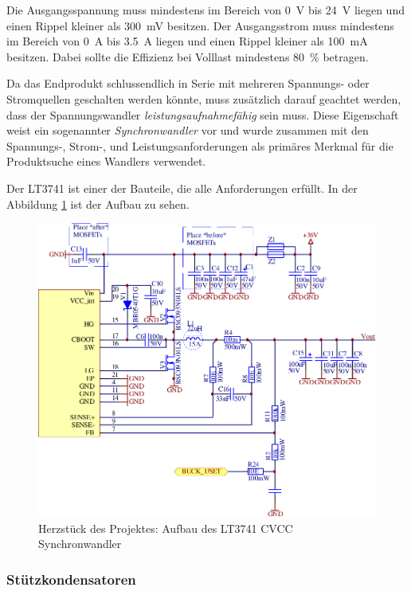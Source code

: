 Die  Ausgangsspannung   muss   mindestens   im  Bereich  von  \SI{0}{\volt}  bis
\SI{24}{\volt}  liegen  und   einen  Rippel  kleiner  als  \SI{300}{\milli\volt}
besitzen.  Der  Ausgangsstrom muss mindestens im Bereich von \SI{0}{\ampere} bis
\SI{3.5}{\ampere} liegen  und  einen  Rippel kleiner als \SI{100}{\milli\ampere}
besitzen. Dabei  sollte  die Effizienz bei Volllast mindestens \SI{80}{\percent}
betragen.

Da  das  Endprodukt  schlussendlich  in  Serie  mit  mehreren   Spannungs-  oder
Stromquellen  geschalten  werden  k\"onnte, muss  zus\"atzlich  darauf  geachtet
werden,  dass  der Spannungswandler \emph{leistungsaufnahmef\"ahig}  sein  muss.
Diese Eigenschaft weist  ein  sogenannter  \emph{Synchronwandler}  vor und wurde
zusammen mit den Spannungs-,  Strom-,  und Leistungsanforderungen als prim\"ares
Merkmal f\"ur die Produktsuche eines Wandlers verwendet.

Der LT3741 ist einer der Bauteile,  die  alle  Anforderungen  erf\"ullt.  In der
Abbildung \ref{fig:circuit:buck} ist der Aufbau zu sehen.

\begin{figure}[th!]
    \center
    \includegraphics[width=.75\textwidth]{images/circuit/buck.pdf}
    \caption{Herzst\"uck des Projektes: Aufbau des LT3741 CVCC Synchronwandler}
    \label{fig:circuit:buck}
\end{figure}

\subsubsection{St\"utzkondensatoren}

